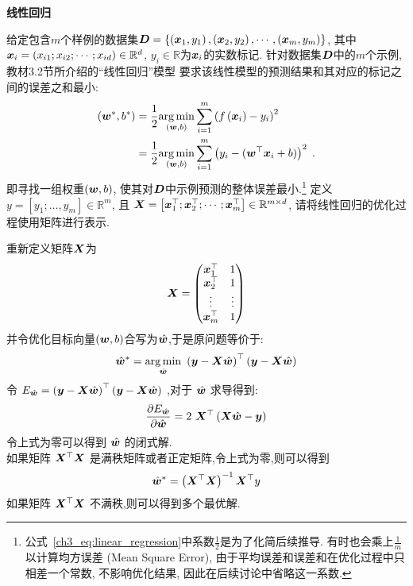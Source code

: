 \documentclass[answers]{exam}  %
\begin{document}
\begin{questions}
	\question [15] \textbf{线性回归}

	给定包含$m$个样例的数据集$\boldsymbol{D}=\left\{\left({\boldsymbol{x}}_{1}, y_{1}\right),\left({\boldsymbol{x}}_{2}, y_{2}\right), \cdots,\left({\boldsymbol{x}}_{m}, y_{m}\right)\right\}$, 其中${\boldsymbol{x}}_{i}=\left(x_{i 1} ; x_{i 2} ; \cdots ; x_{i d}\right) \in \mathbb{R}^{d}$, $y_{i} \in\mathbb{R}$为${\boldsymbol{x}}_{i}$的实数标记.
	针对数据集$\boldsymbol{D}$中的$m$个示例, 教材3.2节所介绍的“线性回归”模型 要求该线性模型的预测结果和其对应的标记之间的误差之和最小:
	\begin{align}
		\left(\boldsymbol{w}^{*}, b^{*}\right) & =\frac{1}{2}\underset{(\boldsymbol{w}, b)}{\arg \min } \sum_{i=1}^{m}\left(f\left({\boldsymbol{x}}_{i}\right)-y_{i}\right)^{2} \notag                            \\
		                            & =\frac{1}{2}\underset{(\boldsymbol{w}, b)}{\arg \min } \sum_{i=1}^{m}\left(y_{i}-(\boldsymbol{w}^\top {\boldsymbol{x}}_{i}+b)\right)^{2}\;.\label{ch3_eq:linear_regression}
	\end{align}
	即寻找一组权重$(\boldsymbol{w}, b)$, 使其对$\boldsymbol{D}$中示例预测的整体误差最小.\footnote{公式~\ref{ch3_eq:linear_regression}中系数$\frac{1}{2}$是为了化简后续推导. 有时也会乘上$\frac{1}{m}$以计算均方误差 (Mean Square Error), 由于平均误差和误差和在优化过程中只相差一个常数, 不影响优化结果, 因此在后续讨论中省略这一系数.}
	定义$y=\left[y_{1}; \ldots, y_{m}\right] \in \mathbb{R}^{m}$, 且 $\boldsymbol{X}=\left[{\boldsymbol{x}}_{1}^\top ; {\boldsymbol{x}}_{2}^\top ; \cdots ; {\boldsymbol{x}}_{m}^\top\right] \in \mathbb{R}^{m \times d}$, 请将线性回归的优化过程使用矩阵进行表示.

	\begin{solution}
		重新定义矩阵$\boldsymbol{X}$为\\
		\begin{equation*}
			\boldsymbol{X} = \begin{pmatrix}
				{\boldsymbol{x}}_1^\top & 1      \\
				{\boldsymbol{x}}_2^\top & 1      \\
				\vdots     & \vdots \\
				{\boldsymbol{x}}_m^\top & 1
			\end{pmatrix}
		\end{equation*}
		并令优化目标向量$(\boldsymbol{w},b)$合写为$\hat{\boldsymbol{w}}$,于是原问题等价于:
		\begin{align*}
			\hat{\boldsymbol{w}}^*=\underset{\hat{\boldsymbol{w}}}{\arg \min }\ \left(\boldsymbol{y} -\boldsymbol{X} \hat{\boldsymbol{w}}\right)^\top \left(\boldsymbol{y} -\boldsymbol{X} \hat{\boldsymbol{w}}\right)
		\end{align*}
		令 $E_{\hat{\boldsymbol{w}}}=\left(\boldsymbol{y} -\boldsymbol{X} \hat{\boldsymbol{w}}\right)^\top \left(\boldsymbol{y} -\boldsymbol{X} \hat{\boldsymbol{w}}\right)$ ,对于 $\hat{\boldsymbol{w}}$ 求导得到:
		\begin{equation*}
			\frac{\partial E_{\hat\vw}}{\partial \hat\vw}=2\ \mX^\top\left(\mX \hat\vw-\vy\right)
		\end{equation*}
		令上式为零可以得到 $\hat{\boldsymbol{w}}$ 的闭式解.\\
		如果矩阵 $\boldsymbol{X}^\top\boldsymbol{X}$ 是满秩矩阵或者正定矩阵,令上式为零,则可以得到
		\begin{equation*}
			\hat{\boldsymbol{w}}^*=\left(\boldsymbol{X}^\top\boldsymbol{X}\right)^{-1}\boldsymbol{X}^\top y
		\end{equation*}
		如果矩阵 $\boldsymbol{X}^\top\boldsymbol{X}$ 不满秩,则可以得到多个最优解.
	\end{solution}



\end{questions}
\end{document}
